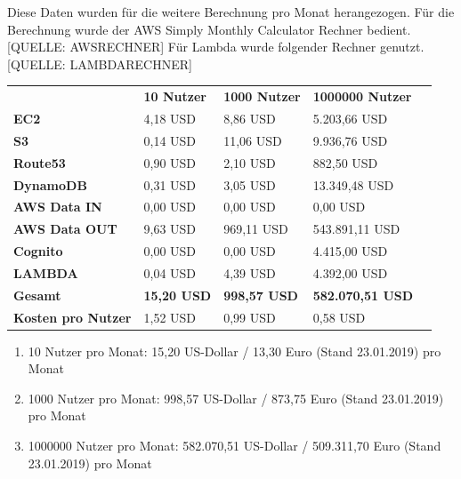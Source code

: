 \documentclass[a4paper, 12pt]{scrreprt}
\renewcommand\_{\textunderscore\allowbreak}
\begin{document}
Diese Daten wurden für die weitere Berechnung pro Monat herangezogen.
Für die Berechnung wurde der AWS Simply Monthly Calculator Rechner bedient. [QUELLE: AWSRECHNER] Für Lambda wurde folgender Rechner genutzt. [QUELLE: LAMBDARECHNER]
\\

\begin{table}[]
\begin{tabular}{|l|l|l|l|l}
\cline{1-4}
          & \textbf{10 Nutzer} & \textbf{1000 Nutzer} & \textbf{1000000 Nutzer} &  \\ \cline{1-4}
\textbf{EC2} & 4,18 USD & 8,86 USD & 5.203,66 USD &  \\ 
\cline{1-4}
\textbf{S3} & 0,14 USD & 11,06 USD &     9.936,76 USD &  \\ 
\cline{1-4}
\textbf{Route53} & 0,90 USD & 2,10 USD & 882,50 USD &  \\ 
\cline{1-4}
\textbf{DynamoDB} & 0,31 USD & 3,05 USD & 13.349,48 USD &  \\ 
\cline{1-4}
\textbf{AWS Data IN} & 0,00 USD & 0,00 USD & 0,00 USD      &  \\ 
\cline{1-4}
\textbf{AWS Data OUT} & 9,63 USD & 969,11 USD & 543.891,11 USD &  \\
\cline{1-4}
\textbf{Cognito} & 0,00 USD & 0,00 USD & 4.415,00 USD &  \\ \cline{1-4}
\textbf{LAMBDA} & 0,04 USD & 4,39 USD & 4.392,00 USD &  \\ \cline{1-4}
\textbf{Gesamt} & \textbf{15,20 USD} & \textbf{998,57 USD} & \textbf{582.070,51 USD} &  \\ \cline{1-4}
\textbf{Kosten pro Nutzer} & 1,52 USD & 0,99 USD & 0,58 USD &  \\ \cline{1-4}
\end{tabular}
\end{table}

\begin{enumerate}
	\item 10 Nutzer pro Monat: 15,20 US-Dollar / 13,30 Euro (Stand 23.01.2019) pro Monat
	\item 1000 Nutzer pro Monat: 998,57 US-Dollar / 873,75 Euro (Stand 23.01.2019) pro Monat
	\item 1000000 Nutzer pro Monat: 582.070,51 US-Dollar / 509.311,70 Euro (Stand 23.01.2019) pro Monat 
\end{enumerate}
\end{document}
